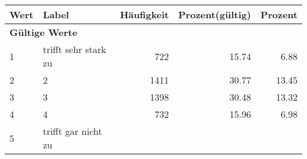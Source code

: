      \begin{longtable}{lXrrr}
     \toprule
     \textbf{Wert} & \textbf{Label} & \textbf{Häufigkeit} & \textbf{Prozent(gültig)} & \textbf{Prozent} \\
     \endhead
     \midrule
     \multicolumn{5}{l}{\textbf{Gültige Werte}}\\

     1 &
     \multicolumn{1}{X}{ trifft sehr stark zu   } &


       \num{722} &
       \num[round-mode=places,round-precision=2]{15.74} &
         \num[round-mode=places,round-precision=2]{6.88} \\

     2 &
     \multicolumn{1}{X}{ 2   } &


       \num{1411} &
       \num[round-mode=places,round-precision=2]{30.77} &
         \num[round-mode=places,round-precision=2]{13.45} \\

     3 &
     \multicolumn{1}{X}{ 3   } &


       \num{1398} &
       \num[round-mode=places,round-precision=2]{30.48} &
         \num[round-mode=places,round-precision=2]{13.32} \\

     4 &
     \multicolumn{1}{X}{ 4   } &


       \num{732} &
       \num[round-mode=places,round-precision=2]{15.96} &
         \num[round-mode=places,round-precision=2]{6.98} \\

     5 &
     \multicolumn{1}{X}{ trifft gar nicht zu   } &



\end{longtable}
